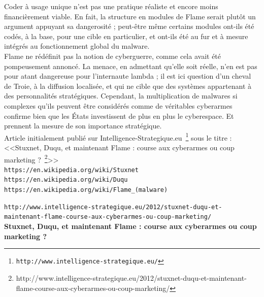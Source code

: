 \documentclass[11pt,twoside,a4paper]{article}
\begin{document}
Coder {\`a} usage unique n'est pas une pratique r{\'e}aliste et encore moins financi{\`e}rement viable. En fait, la structure en modules de Flame serait plut{\^o}t un argument appuyant sa dangerosit{\'e} ; peut-{\^e}tre m{\^e}me certains modules ont-ils {\'e}t{\'e} cod{\'e}s, {\`a} la base, pour une cible en particulier, et ont-ils {\'e}t{\'e} au fur et {\`a} mesure int{\'e}gr{\'e}s au fonctionnement global du malware.~\\

Flame ne r{\'e}d{\'e}finit pas la notion de cyberguerre, comme cela avait {\'e}t{\'e} pompeusement annonc{\'e}. La menace, en admettant qu'elle soit r{\'e}elle, n'en est pas pour atant dangereuse pour l'internaute lambda ; il est ici question d'un cheval de Troie, {\`a} la diffusion localis{\'e}e, et qui ne cible que des syst{\`e}mes appartenant {\`a} des personnalit{\'e}s strat{\'e}giques. Cependant, la multiplication de malwares si complexes qu'ils peuvent {\^e}tre consid{\'e}r{\'e}s comme de v{\'e}ritables cyberarmes confirme bien que les {\'E}tats investissent de plus en plus le cyberespace. Et prennent la mesure de son importance strat{\'e}gique.~\\

Article initialement publi{\'e} sur Intelligence-Strategique.eu~\footnote{\texttt{http://www.intelligence-strategique.eu/}} sous le titre : <<Stuxnet, Duqu, et maintenant Flame : course aux cyberarmes ou coup marketing ?~\footnote{http://www.intelligence-strategique.eu/2012/stuxnet-duqu-et-maintenant-flame-course-aux-cyberarmes-ou-coup-marketing/}>>~\\



\texttt{https://en.wikipedia.org/wiki/Stuxnet}~\\


\texttt{https://en.wikipedia.org/wiki/Duqu}~\\


\texttt{https://en.wikipedia.org/wiki/Flame\_(malware)}~\\


\clearpage

\texttt{http://www.intelligence-strategique.eu/2012/stuxnet-duqu-et-maintenant-flame-course-aux-cyberarmes-ou-coup-marketing/}~\\

\textbf{\LARGE Stuxnet, Duqu, et maintenant Flame : course aux cyberarmes ou coup marketing ?}~\\
\end{document}
